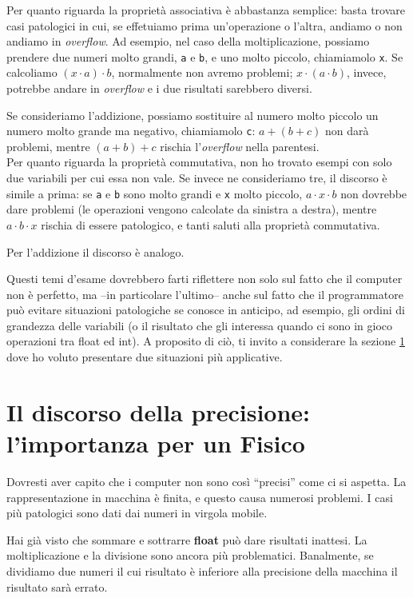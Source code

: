 \begin{itemize}
	Per quanto riguarda la proprietà associativa è abbastanza semplice: basta trovare casi patologici in cui, se effetuiamo prima un'operazione o l'altra, andiamo o non andiamo in \emph{overflow}. Ad esempio, nel caso della moltiplicazione, possiamo prendere due numeri molto grandi, \verb|a| e \verb|b|, e uno molto piccolo, chiamiamolo \verb|x|. Se calcoliamo $(x\cdot a)\cdot b$, normalmente non avremo problemi; $x\cdot (a\cdot b)$, invece, potrebbe andare in \emph{overflow} e i due risultati sarebbero diversi. 
	
	Se consideriamo l'addizione, possiamo sostituire al numero molto piccolo un numero molto grande ma negativo, chiamiamolo \verb|c|: $a+(b+c)$ non darà problemi, mentre $(a+b)+c$ rischia l'\emph{overflow} nella parentesi. \\
	
	Per quanto riguarda la proprietà commutativa, non ho trovato esempi con solo due variabili per cui essa non vale. Se invece ne consideriamo tre, il discorso è simile a prima: se \verb|a| e \verb|b| sono molto grandi e \verb|x| molto piccolo, $a\cdot x\cdot b$  non dovrebbe dare problemi (le operazioni vengono calcolate da sinistra a destra), mentre  $a\cdot b\cdot x$ rischia di essere patologico, e tanti saluti alla proprietà commutativa.
	
	Per l'addizione il discorso è analogo. 
\end{itemize}

	Questi temi d'esame dovrebbero farti riflettere non solo sul fatto che il computer non è perfetto, ma --in particolare l'ultimo-- anche sul fatto che il programmatore può evitare situazioni patologiche se conosce in anticipo, ad esempio, gli ordini di grandezza delle variabili (o il risultato che gli interessa quando ci sono in gioco operazioni tra float ed int). A proposito di ciò, ti invito a considerare la sezione  \ref{precfis} dove ho voluto presentare due situazioni più applicative. 
	\section{Il discorso della precisione: l'importanza per un Fisico}\label{precfis}
	Dovresti aver capito che i computer non sono così ``precisi'' come ci si aspetta. La rappresentazione in macchina è finita, e questo causa numerosi problemi. I casi più patologici sono dati dai numeri in virgola mobile. 
	
	Hai già visto che sommare e sottrarre \textbf{float} può dare risultati inattesi. La moltiplicazione e la divisione sono ancora più problematici. Banalmente, se dividiamo due numeri il cui risultato è inferiore alla precisione della macchina il risultato sarà errato. 
	

